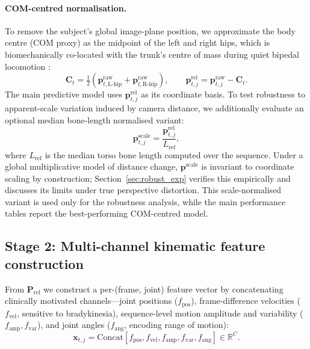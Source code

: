 \documentclass[preprint,12pt]{elsarticle}
\begin{document}
\paragraph{COM-centred normalisation.}
To remove the subject's global image-plane position, we approximate the body
centre (COM proxy) as the midpoint of the left and right hips, which is
biomechanically co-located with the trunk's centre of mass during quiet
bipedal locomotion \cite{winter2009biomechanics}:
\begin{equation}
\mathbf{C}_t = \tfrac{1}{2}\!\left(
\mathbf{p}^{\text{raw}}_{t,\text{L-hip}}+\mathbf{p}^{\text{raw}}_{t,\text{R-hip}}\right),
\qquad
\mathbf{p}^{\text{rel}}_{t,j}=\mathbf{p}^{\text{raw}}_{t,j}-\mathbf{C}_t .
\label{eq:trans}
\end{equation}
The main predictive model uses $\mathbf{p}^{\text{rel}}_{t,j}$ as its coordinate
basis. To test robustness to apparent-scale variation induced by camera
distance, we additionally evaluate an optional median bone-length normalised
variant:
\begin{equation}
\mathbf{p}^{\text{scale}}_{t,j}=\frac{\mathbf{p}^{\text{rel}}_{t,j}}{L_{\text{ref}}},
\label{eq:norm}
\end{equation}
where $L_{\text{ref}}$ is the median torso bone length computed over the
sequence. Under a global multiplicative model of distance change,
$\mathbf{p}^{\text{scale}}$ is invariant to coordinate scaling by construction;
Section~\ref{sec:robust_exp} verifies this empirically and discusses its limits
under true perspective distortion. This scale-normalised variant is used only
for the robustness analysis, while the main performance tables report the
best-performing COM-centred model.

\subsection{Stage 2: Multi-channel kinematic feature construction}
\label{sec:stage2}
From $\mathbf{P}_{\text{rel}}$ we construct a per-(frame, joint) feature
vector by concatenating clinically motivated channels---joint positions
($f_{\text{pos}}$), frame-difference velocities ($f_{\text{vel}}$,
sensitive to bradykinesia), sequence-level motion amplitude and variability
($f_{\text{amp}},f_{\text{var}}$), and joint angles
($f_{\text{ang}}$, encoding range of motion):
\begin{equation}
\mathbf{x}_{t,j}=\mathrm{Concat}\!\left[
f_{\text{pos}},f_{\text{vel}},f_{\text{amp}},f_{\text{var}},f_{\text{ang}}\right]\in\mathbb{R}^{C}.
\end{equation}
\end{document}
